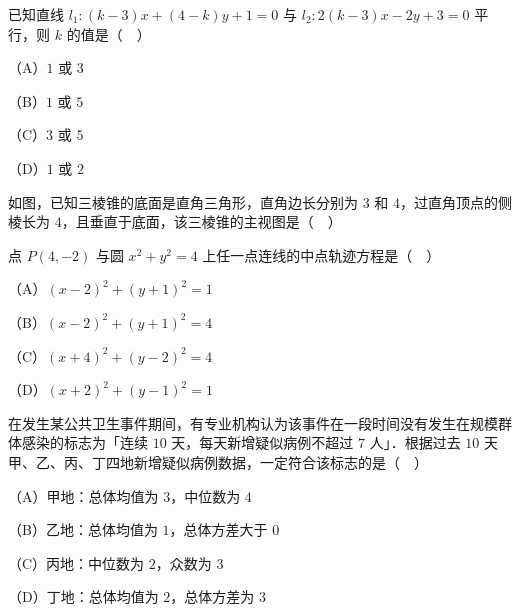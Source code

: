 \begin{question}
已知直线 $l_1:(k-3)x+(4-k)y+1=0$ 与 $l_2:2(k-3)x-2y+3=0$ 平行，则 $k$ 的值是（　）

（A）$1$ 或 $3$

（B）$1$ 或 $5$

（C）$3$ 或 $5$

（D）$1$ 或 $2$

\Needspace{0.4\textheight}
\end{question}
\begin{question}
如图，已知三棱锥的底面是直角三角形，直角边长分别为 $3$ 和 $4$，过直角顶点的侧棱长为 $4$，且垂直于底面，该三棱锥的主视图是（　）
\nopagebreak[4]
\begin{center}\end{center}
\nopagebreak[4]
\end{question}
\begin{question}
点 $P(4,-2)$ 与圆 $x^2+y^2=4$ 上任一点连线的中点轨迹方程是（　）

（A）$(x-2)^2+(y+1)^2=1$

（B）$(x-2)^2+(y+1)^2=4$

（C）$(x+4)^2+(y-2)^2=4$

（D）$(x+2)^2+(y-1)^2=1$

\end{question}
\begin{question}
在发生某公共卫生事件期间，有专业机构认为该事件在一段时间没有发生在规模群体感染的标志为「连续 $10$ 天，每天新增疑似病例不超过 $7$ 人」．根据过去 $10$ 天甲、乙、丙、丁四地新增疑似病例数据，一定符合该标志的是（　）

（A）甲地：总体均值为 $3$，中位数为 $4$

（B）乙地：总体均值为 $1$，总体方差大于 $0$

（C）丙地：中位数为 $2$，众数为 $3$

（D）丁地：总体均值为 $2$，总体方差为 $3$

\end{question}

